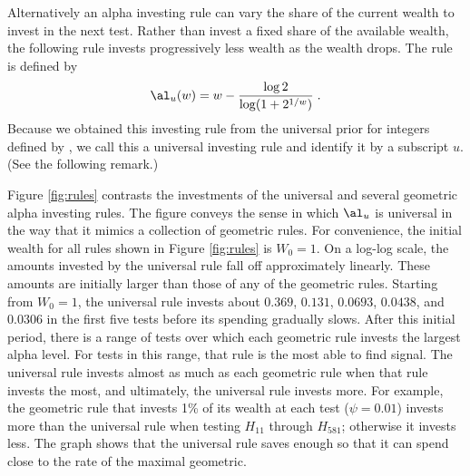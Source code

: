 \documentclass[12pt]{article}
\begin{document}
 Alternatively an alpha investing rule can vary the share of the current wealth
 to invest in the next test.  Rather than invest a fixed share of the available
 wealth, the following rule invests progressively less wealth as the wealth
 drops.  The rule is defined by
 \begin{equation}
   \al_u(w) = w - \frac{\log 2}{\log(1+2^{1/w})} \;.   
 \label{eq:Auniv}
 \end{equation}
 Because we obtained this investing rule from the universal prior for integers
 defined by \citet{rissanen83}, we call this a universal investing rule and
 identify it by a subscript $u$.  (See the following remark.)

 
 Figure \ref{fig:rules} contrasts the investments of the universal and
 several geometric alpha investing rules.  The figure conveys
 the sense in which $\al_u$ is universal in the way that it mimics a collection
 of geometric rules.  For convenience, the initial wealth for all rules shown in
 Figure \ref{fig:rules} is $W_0 = 1$.  On a log-log scale, the amounts invested
 by the universal rule fall off approximately linearly.  These amounts are
 initially larger than those of any of the geometric rules.  Starting from
 $W_0=1$, the universal rule invests about $0.369$, $0.131$, $0.0693$, $0.0438$,
 and $0.0306$ in the first five tests before its spending gradually slows.
  After this initial period, there is a range of tests over which each geometric rule invests the largest alpha level.  For tests in this range, that rule is the most able to find signal. The universal rule invests almost as much as each geometric rule when that rule invests the most, and ultimately,  the universal rule invests more.  For example, the
 geometric rule that invests 1\% of its wealth at each test ($\psi=0.01$)
 invests more than the universal rule when testing $H_{11}$ through $H_{581}$;
 otherwise it invests less.  
 The graph shows that the universal rule saves enough so that it can spend
 close to the rate of the maximal geometric.  

\end{document}
